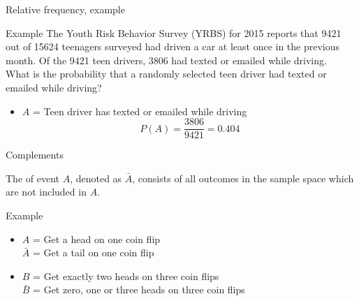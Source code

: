 \documentclass[xcolor=table]{beamer}
\begin{document}
\begin{frame}{Relative frequency, example}

\begin{exampleblock}{Example}
The Youth Risk Behavior Survey (YRBS) for 2015 reports that 9421 out of 15624 teenagers surveyed had driven a car at least once in the previous month. Of the 9421 teen drivers, 3806 had texted or emailed while driving. \\
\medskip
What is the probability that a randomly selected teen driver had texted or emailed while driving? 

\pause
\begin{itemize}
\item $A$ = Teen driver has texted or emailed while driving\\
\[P(A) = \frac {3806}{9421} = 0.404\]
\end{itemize}

\end{exampleblock}

\end{frame}


\begin{frame}{Complements}
\begin{block}{}
\large The  of event $A$, denoted as $\bar A$, consists of all outcomes in the sample space which are not included in $A$.
\end{block}

\pause
\begin{exampleblock}{Example}
\begin{itemize}
\item $A$ = Get a head on one coin flip\\
\pause
$\bar A$ = Get a tail on one coin flip

\pause
\item $B$ = Get exactly two heads on three coin flips\\
\pause
$\bar B$ = Get zero, one or three heads on three coin flips
\end{itemize}
\end{exampleblock}
\end{frame}
 
\end{document}
